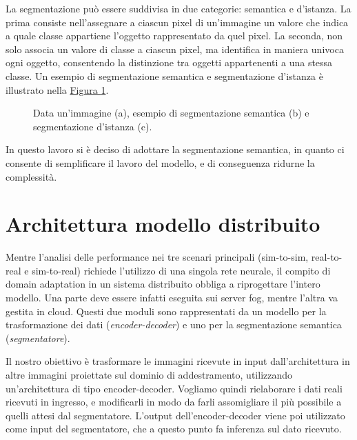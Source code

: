 \documentclass[12pt]{report}
\begin{document}
La segmentazione può essere suddivisa in due categorie: semantica e d'istanza. La prima consiste nell'assegnare a ciascun pixel di un'immagine un valore che indica a quale classe appartiene l'oggetto rappresentato da quel pixel. La seconda, non solo associa un valore di classe a ciascun pixel, ma identifica in maniera univoca ogni oggetto, consentendo la distinzione tra oggetti appartenenti a una stessa classe. Un esempio di segmentazione semantica e segmentazione d'istanza è illustrato nella \hyperref[fig:segmentazione]{Figura \ref{fig:segmentazione}}.

\begin{figure}[t]
	\centering
	\hspace{0.01\textwidth}
	\hspace{0.01\textwidth}
	\caption{Data un'immagine (a), esempio di segmentazione semantica (b) e segmentazione d'istanza (c).}
	\label{fig:segmentazione}
\end{figure}

In questo lavoro si è deciso di adottare la segmentazione semantica, in quanto ci consente di semplificare il lavoro del modello, e di conseguenza ridurne la complessità.

\section{Architettura modello distribuito}
\label{sec:modello_per_fog_robotics}

Mentre l'analisi delle performance nei tre scenari principali (sim-to-sim, real-to-real e sim-to-real) richiede l'utilizzo di una singola rete neurale, il compito di domain adaptation in un sistema distribuito obbliga a riprogettare l'intero modello. Una parte deve essere infatti eseguita sui server fog, mentre l'altra va gestita in cloud. Questi due moduli sono rappresentati da un modello per la trasformazione dei dati (\textit{encoder-decoder}) e uno per la segmentazione semantica (\textit{segmentatore}).

Il nostro obiettivo è trasformare le immagini ricevute in input dall'architettura in altre immagini proiettate sul dominio di addestramento, utilizzando un'architettura di tipo encoder-decoder. Vogliamo quindi rielaborare i dati reali ricevuti in ingresso, e modificarli in modo da farli assomigliare il più possibile a quelli attesi dal segmentatore. L'output dell'encoder-decoder viene poi utilizzato come input del segmentatore, che a questo punto fa inferenza sul dato ricevuto.
\end{document}
